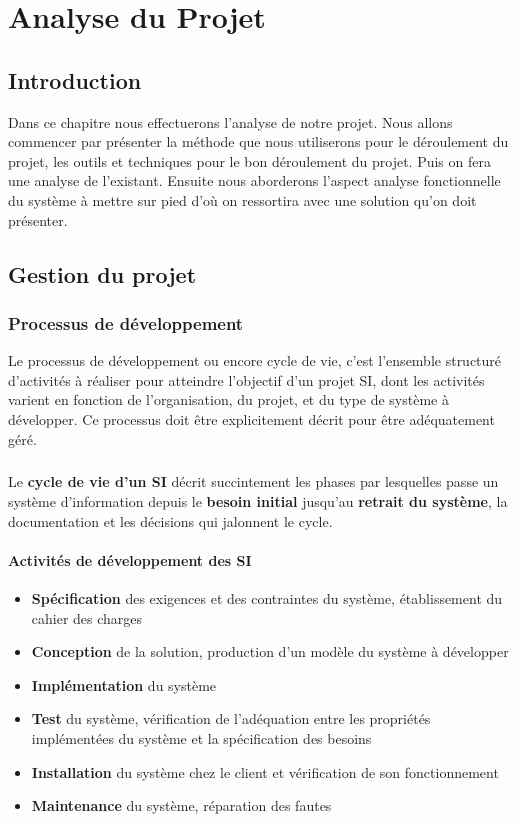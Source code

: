\chapter{Analyse du Projet}

\section*{Introduction}%
%
Dans ce chapitre nous effectuerons l’analyse de notre projet. Nous allons commencer par présenter la méthode que nous utiliserons pour le déroulement du projet, les outils et techniques pour le bon déroulement du projet. Puis on fera une analyse de l'existant. Ensuite nous aborderons l’aspect analyse fonctionnelle du système à mettre sur pied d’où on ressortira avec une solution qu’on doit présenter.
\section{Gestion du projet }
\subsection{Processus de développement }
Le processus de développement ou encore cycle de vie, c'est l'ensemble structuré d'activités à réaliser pour atteindre l'objectif d'un projet SI, dont les activités varient en fonction de l'organisation, du projet, et du type de système à développer. Ce processus doit être explicitement décrit pour être adéquatement géré. 
\paragraph{}
Le \textbf{cycle de vie d'un SI} décrit succintement les phases par lesquelles passe un système d'information depuis le \textbf{besoin initial} jusqu'au \textbf{retrait du système}, la documentation et les décisions qui jalonnent le cycle.

\subsubsection{Activités de développement des SI}
\begin{itemize}
    \item \textbf{Spécification} des exigences et des contraintes du système, établissement du cahier des charges
    \item \textbf{Conception} de la solution, production d'un modèle du système à développer
    \item \textbf{Implémentation} du système
    \item \textbf{Test} du système, vérification de l'adéquation entre les propriétés implémentées du système et la spécification des besoins
    \item \textbf{Installation} du système chez le client et vérification de son fonctionnement
    \item \textbf{Maintenance} du système, réparation des fautes
\end{itemize}

